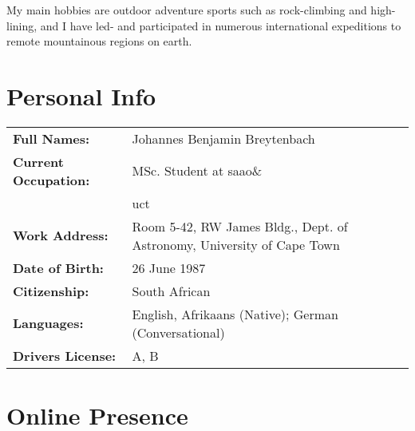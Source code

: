 \documentclass{article}
\newcommand{\uct}{\gls*{uct}\xspace}
\newcommand{\saao}{\gls*{saao}\xspace}
\begin{document}
%


My main hobbies are outdoor adventure sports such as rock-climbing and
high-lining, and I have led- and participated in numerous international
expeditions to remote mountainous regions on earth.




\section{Personal Info}

\begin{tabular}[h!]{l l} 
  \textbf{Full Names:}          & Johannes Benjamin Breytenbach\\
  \textbf{Current Occupation:}  & MSc. Student at \saao \& \\ & \uct\\
  \textbf{Work Address:}        & Room 5-42, RW James Bldg., Dept. of Astronomy, 
                                  University of Cape Town \\
  \textbf{Date of Birth:}       & 26 June 1987  \\
  \textbf{Citizenship:}         & South African\\
  \textbf{Languages:}           & English, Afrikaans (Native); German (Conversational) \\
  \textbf{Drivers License:}     & A, B

\end{tabular}




\section{Online Presence}
\end{document}
